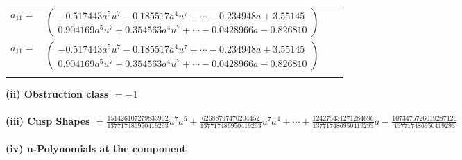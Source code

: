\documentclass[1p]{elsarticle_modified}
\theoremstyle{definition}
\begin{document}
\begin{tabular}{m{7pt} m{180pt} m{7pt} m{180pt} }
\flushright $a_{11}=$&$\begin{pmatrix}-0.517443 a^{5} u^{7}-0.185517 a^{4} u^{7}+\cdots-0.234948 a+3.55145\\0.904169 a^{5} u^{7}+0.354563 a^{4} u^{7}+\cdots-0.0428966 a-0.826810\end{pmatrix}$\\ \flushright $a_{11}=$&$\begin{pmatrix}-0.517443 a^{5} u^{7}-0.185517 a^{4} u^{7}+\cdots-0.234948 a+3.55145\\0.904169 a^{5} u^{7}+0.354563 a^{4} u^{7}+\cdots-0.0428966 a-0.826810\end{pmatrix}$\\&\end{tabular}
\flushleft \textbf{(ii) Obstruction class $= -1$}\\~\\
\flushleft \textbf{(iii) Cusp Shapes $= \frac{151426107279833992}{137717486950419293} u^7 a^5+\frac{62688797470204452}{137717486950419293} u^7 a^4+\cdots+\frac{124275431271284696}{137717486950419293} a-\frac{1073475726019287126}{137717486950419293}$}\\~\\
\newpage\renewcommand{\arraystretch}{1}
\flushleft \textbf{(iv) u-Polynomials at the component}\newline \\
\end{document}
